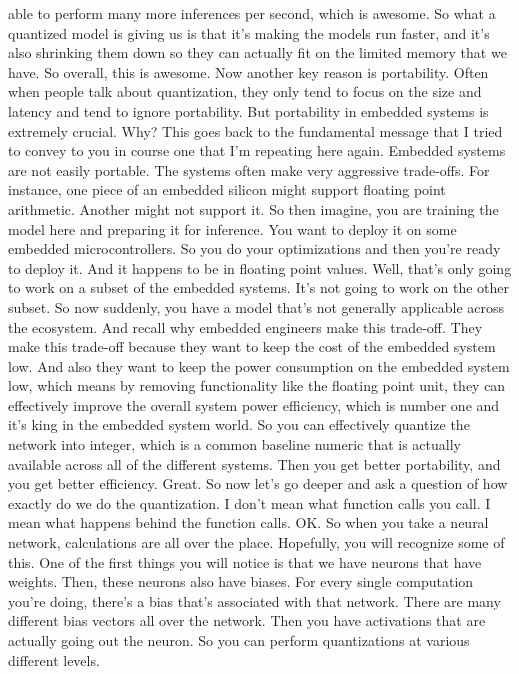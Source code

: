 able to perform many more inferences per second, which is awesome.
So what a quantized model is giving us is
that it's making the models run faster, and it's also shrinking them down
so they can actually fit on the limited memory that we have.
So overall, this is awesome.
Now another key reason is portability.
Often when people talk about quantization,
they only tend to focus on the size and latency and tend to ignore portability.
But portability in embedded systems is extremely crucial.
Why?
This goes back to the fundamental message
that I tried to convey to you in course one that I'm repeating here again.
Embedded systems are not easily portable.
The systems often make very aggressive trade-offs.
For instance, one piece of an embedded silicon
might support floating point arithmetic.
Another might not support it.
So then imagine, you are training the model here and preparing it
for inference.
You want to deploy it on some embedded microcontrollers.
So you do your optimizations and then you're ready to deploy it.
And it happens to be in floating point values.
Well, that's only going to work on a subset of the embedded systems.
It's not going to work on the other subset.
So now suddenly, you have a model that's not generally
applicable across the ecosystem.
And recall why embedded engineers make this trade-off.
They make this trade-off because they want
to keep the cost of the embedded system low.
And also they want to keep the power consumption on the embedded system
low, which means by removing functionality like the floating point
unit, they can effectively improve the overall system power
efficiency, which is number one and it's king in the embedded system world.
So you can effectively quantize the network
into integer, which is a common baseline numeric that
is actually available across all of the different systems.
Then you get better portability, and you get better efficiency.
Great.
So now let's go deeper and ask a question
of how exactly do we do the quantization.
I don't mean what function calls you call.
I mean what happens behind the function calls.
OK.
So when you take a neural network, calculations are all over the place.
Hopefully, you will recognize some of this.
One of the first things you will notice is
that we have neurons that have weights.
Then, these neurons also have biases.
For every single computation you're doing,
there's a bias that's associated with that network.
There are many different bias vectors all over the network.
Then you have activations that are actually going out the neuron.
So you can perform quantizations at various different levels.

